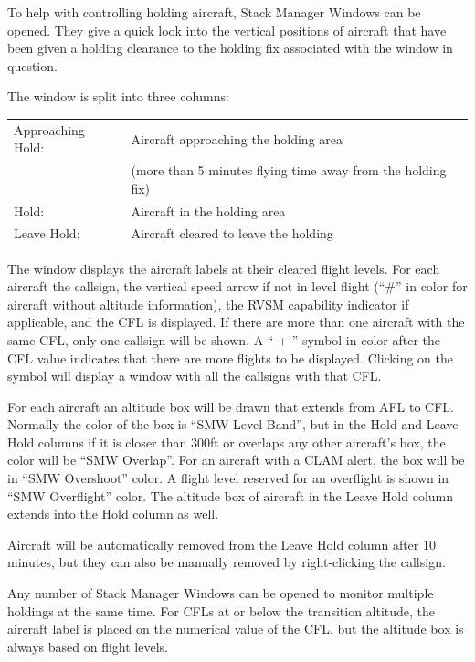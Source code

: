 \documentclass[11pt,a4paper]{memoir}
\newcommand{\colorref}[1]{\textit{\hyperref[#1]{\StrDel{#1}{color:}}}}
\begin{document}
To help with controlling holding aircraft, Stack Manager Windows can be opened. They give a quick look into the vertical positions of aircraft that have been given a holding clearance to the holding fix associated with the window in question.

The window is split into three columns:

\begin{tabular}{l l}
    Approaching Hold:   & Aircraft approaching the holding area\\
                        & (more than 5 minutes flying time away from the holding fix)\\
    Hold:               & Aircraft in the holding area\\
    Leave Hold:         & Aircraft cleared to leave the holding\\   
\end{tabular}

The window displays the aircraft labels at their cleared flight levels. For each aircraft the callsign, the vertical speed arrow if not in level flight (“\#” in \colorref{color:Warning} color for aircraft without altitude information), the RVSM capability indicator if applicable, and the CFL is displayed. If there are more than one aircraft with the same CFL, only one callsign will be shown. A “ + ” symbol in \colorref{color:SMW Overlap Box} color after the CFL value indicates that there are more flights to be displayed. Clicking on the symbol will display a window with all the callsigns with that CFL.

For each aircraft an altitude box will be drawn that extends from AFL to CFL. Normally the color of the box is “SMW Level Band”, but in the Hold and Leave Hold columns if it is closer than 300ft or overlaps any other aircraft’s box, the color will be “SMW Overlap”. For an aircraft with a CLAM alert, the box will be in “SMW Overshoot” color. A flight level reserved for an overflight is shown in “SMW Overflight” color. The altitude box of aircraft in the Leave Hold column extends into the Hold column as well.

Aircraft will be automatically removed from the Leave Hold column after 10 minutes, but they can also be manually removed by right-clicking the callsign.

Any number of Stack Manager Windows can be opened to monitor multiple holdings at the same time. For CFLs at or below the transition altitude, the aircraft label is placed on the numerical value of the CFL, but the altitude box is always based on flight levels.
\end{document}
